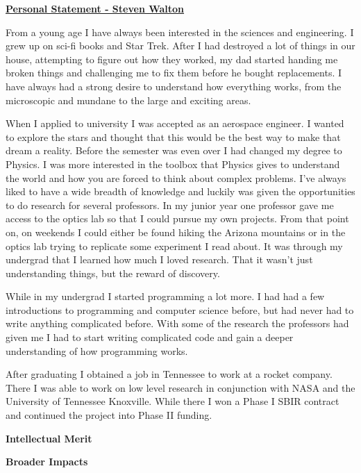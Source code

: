 \documentclass[12pt]{article}
\begin{document}
\begin{center}
\underline{\bf Personal Statement - Steven Walton}\\
\end{center}
From a young age I have always been interested in the sciences and engineering.
I grew up on sci-fi books and Star Trek. After I had destroyed a lot of things
in our house, attempting to figure out how they worked, my dad started handing
me broken things and challenging me to fix them before he bought replacements. I
have always had a strong desire to understand how everything works, from the
microscopic and mundane to the large and exciting areas. 

When I applied to university I was accepted as an aerospace engineer. I wanted
to explore the stars and thought that this would be the best way to make that
dream a reality. Before the semester was even over I had changed my degree to
Physics. I was more interested in the toolbox that Physics gives to understand
the world and how you are forced to think about complex problems. I've always
liked to have a wide breadth of knowledge and luckily was given the
opportunities to do research for several professors. In my junior year one
professor gave me access to the optics lab so that I could pursue my own
projects. From that point on, on weekends I could either be found hiking the
Arizona mountains or in the optics lab trying to replicate some experiment I
read about. It was through my undergrad that I learned how much I loved
research. That it wasn't just understanding things, but the reward of discovery. 

While in my undergrad I started programming a lot more. I had had a few
introductions to programming and computer science before, but had never had to
write anything complicated before. With some of the research the professors had
given me I had to start writing complicated code and gain a deeper understanding
of how programming works. 

After graduating I obtained a job in Tennessee to work at a rocket company.
There I was able to work on low level research in conjunction with NASA and the
University of Tennessee Knoxville. While there I won a Phase I SBIR contract and
continued the project into Phase II funding. 

\noindent\textbf{Intellectual Merit}
\noindent

\noindent\textbf{Broader Impacts}
\noindent
\end{document}
